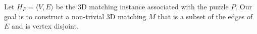 \documentclass[11pt]{article}
\begin{document}
Let $H_P = \langle V, E \rangle$ be the 3D matching instance
associated with the puzzle $P$.  Our goal is to construct a
non-trivial 3D matching $M$ that is a subset of the edges of $E$ and
is vertex disjoint.
\end{document}
